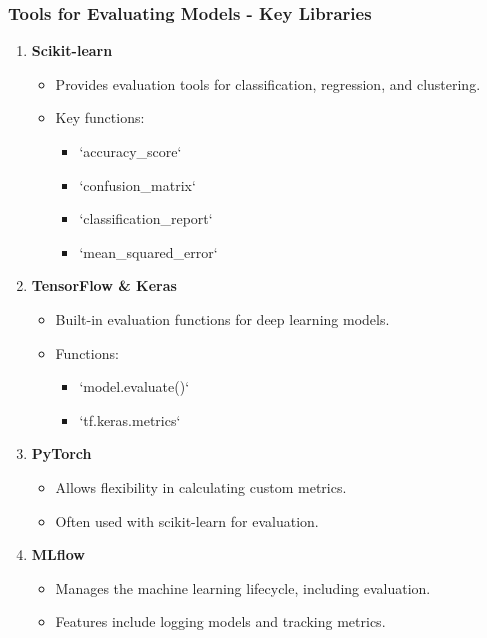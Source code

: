 \documentclass[aspectratio=169]{beamer}
\begin{document}
\begin{frame}[fragile]
    \frametitle{Tools for Evaluating Models - Key Libraries}
    \begin{enumerate}
        \item \textbf{Scikit-learn}
          \begin{itemize}
              \item Provides evaluation tools for classification, regression, and clustering.
              \item Key functions: 
                \begin{itemize}
                    \item `accuracy\_score`
                    \item `confusion\_matrix`
                    \item `classification\_report`
                    \item `mean\_squared\_error`
                \end{itemize}
          \end{itemize}
          
        \item \textbf{TensorFlow \& Keras}
          \begin{itemize}
              \item Built-in evaluation functions for deep learning models.
              \item Functions: 
                \begin{itemize}
                    \item `model.evaluate()`
                    \item `tf.keras.metrics`
                \end{itemize}
          \end{itemize}
          
        \item \textbf{PyTorch}
          \begin{itemize}
              \item Allows flexibility in calculating custom metrics.
              \item Often used with scikit-learn for evaluation.
          \end{itemize}

        \item \textbf{MLflow}
          \begin{itemize}
              \item Manages the machine learning lifecycle, including evaluation.
              \item Features include logging models and tracking metrics.
          \end{itemize}
    \end{enumerate}
\end{frame}
\end{document}
